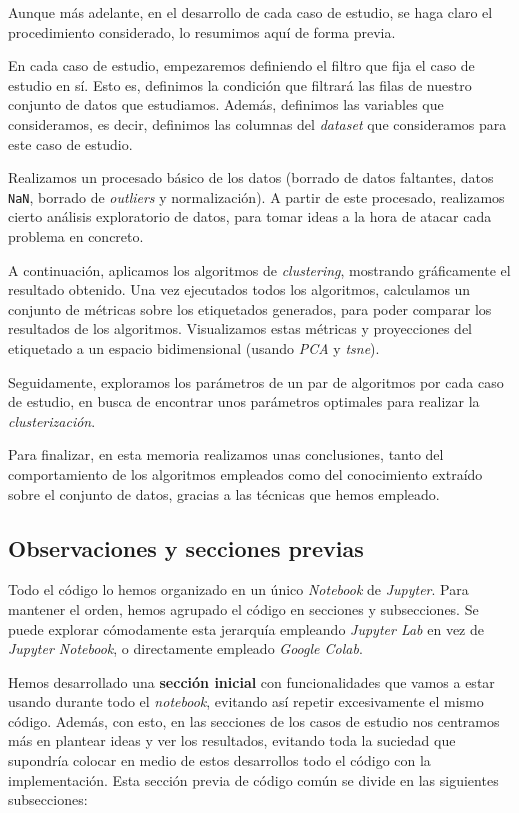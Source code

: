 \documentclass[11pt]{article}
\begin{document}
Aunque más adelante, en el desarrollo de cada caso de estudio, se haga claro el procedimiento considerado, lo resumimos aquí de forma previa.

En cada caso de estudio, empezaremos definiendo el filtro que fija el caso de estudio en sí. Esto es, definimos la condición que filtrará las filas de nuestro conjunto de datos que estudiamos. Además, definimos las variables que consideramos, es decir, definimos las columnas del \emph{dataset} que consideramos para este caso de estudio.

Realizamos un procesado básico de los datos (borrado de datos faltantes, datos \lstinline{NaN}, borrado de \emph{outliers} y normalización). A partir de este procesado, realizamos cierto análisis exploratorio de datos, para tomar ideas a la hora de atacar cada problema en concreto.

A continuación, aplicamos los algoritmos de \emph{clustering}, mostrando gráficamente el resultado obtenido. Una vez ejecutados todos los algoritmos, calculamos un conjunto de métricas sobre los etiquetados generados, para poder comparar los resultados de los algoritmos. Visualizamos estas métricas y proyecciones del etiquetado a un espacio bidimensional (usando \emph{PCA} y \emph{tsne}).

Seguidamente, exploramos los parámetros de un par de algoritmos por cada caso de estudio, en busca de encontrar unos parámetros optimales para realizar la \emph{clusterización}.

Para finalizar, en esta memoria realizamos unas conclusiones, tanto del comportamiento de los algoritmos empleados como del conocimiento extraído sobre el conjunto de datos, gracias a las técnicas que hemos empleado.

\subsection{Observaciones y secciones previas}

Todo el código lo hemos organizado en un único \emph{Notebook} de \emph{Jupyter}. Para mantener el orden, hemos agrupado el código en secciones y subsecciones. Se puede explorar cómodamente esta jerarquía empleando \emph{Jupyter Lab} en vez de \emph{Jupyter Notebook}, o directamente empleado \emph{Google Colab}.

Hemos desarrollado una \textbf{sección inicial} con funcionalidades que vamos a estar usando durante todo el \emph{notebook}, evitando así repetir excesivamente el mismo código. Además, con esto, en las secciones de los casos de estudio nos centramos más en plantear ideas y ver los resultados, evitando toda la suciedad que supondría colocar en medio de estos desarrollos todo el código con la implementación. Esta sección previa de código común se divide en las siguientes subsecciones:
\end{document}
